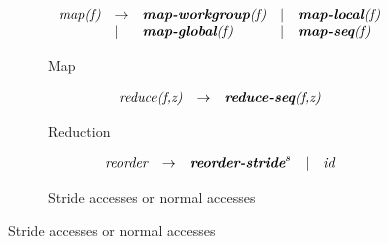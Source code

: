 \begin{figure}[t]
\centering


\begin{subfigure}[b]{1\linewidth}
\begin{mdframed}
\vspace{-.5em}
$$
\begin{array}{lllll}
\textit{map(f)} & \rightarrow & \textit{\textbf{map-workgroup}(f)} & | & \textit{\textbf{map-local}(f)}\\
 & | & \textit{\textbf{map-global}(f)} & | & \textit{\textbf{map-seq}(f)}\\          
\end{array}
$$
\end{mdframed}
  \caption{Map}
  \label{fig:low:map}
\end{subfigure}

\vspace{\ruleSpace}
\begin{subfigure}[b]{1\linewidth}
\begin{mdframed}
$$
\begin{array}{lll}
  \pat{reduce(f,z)} & \rightarrow & \pat{\textbf{reduce-seq}(f,z)}%
\end{array}
$$
\end{mdframed}
  \caption{Reduction}
  \label{fig:low:red}
\end{subfigure}

\vspace{\ruleSpace}
\begin{subfigure}[b]{1\linewidth}
\begin{mdframed}
$$
\begin{array}{lllll}
  \textit{reorder}  & \rightarrow & \textit{\textbf{reorder-stride}}^s & | & \textit{id}
\end{array}
$$
\end{mdframed}
  \caption{Stride accesses or normal accesses}
  \label{fig:low:stride}
\end{subfigure}


\end{figure}

